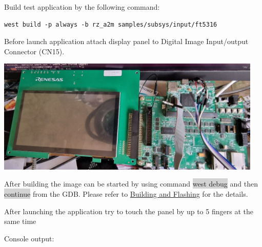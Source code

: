 \documentclass[11pt,a4paper,oneside]{article}
\begin{document}
Build test application by the following command:
\begin{lstlisting}
west build -p always -b rz_a2m samples/subsys/input/ft5316
\end{lstlisting}

Before launch application attach display panel to Digital Image Input/output Connector (CN15).

\includegraphics[width=5in,height=2.15in]{./media/touchpad.jpg}

After building the image can be started by using command \colorbox{lightgray}{west debug}
and then \colorbox{lightgray}{continue} from the GDB. Please refer to
\hyperref[building-and-flashing]{Building and Flashing} for the
details.

After launching the application try to touch the panel by up to 5 fingers at the same time

Console output:
\end{document}
